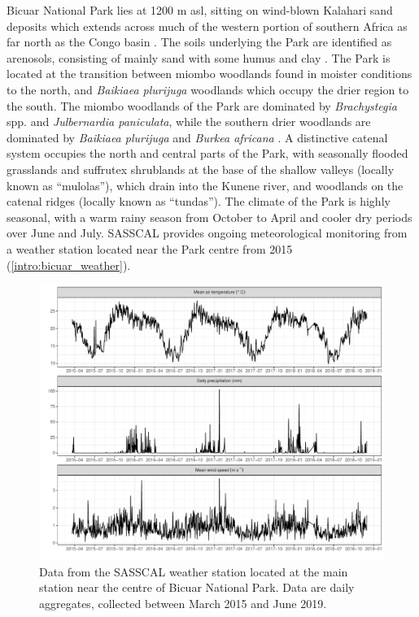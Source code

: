 \begin{refsection}
Bicuar National Park lies at \textapprox{}1200 m asl, sitting on wind-blown Kalahari sand deposits which extends across much of the western portion of southern Africa as far north as the Congo basin \citep{Shaw2002}. The soils underlying the Park are identified as arenosols, consisting of mainly sand with some humus and clay \citep{Jones2013, Hartemink2008}. The Park is located at the transition between miombo woodlands found in moister conditions to the north, and \textit{Baikiaea plurijuga} woodlands which occupy the drier region to the south. The miombo woodlands of the Park are dominated by \textit{Brachystegia} spp. and \textit{Julbernardia paniculata}, while the southern drier woodlands are dominated by \textit{Baikiaea plurijuga} and \textit{Burkea africana} \citep{Teixeira1968}. A distinctive catenal system occupies the north and central parts of the Park, with seasonally flooded grasslands and suffrutex shrublands at the base of the shallow valleys (locally known as ``mulolas''), which drain into the Kunene river, and woodlands on the catenal ridges (locally known as ``tundas''). The climate of the Park is highly seasonal, with a warm rainy season from October to April and cooler dry periods over June and July. SASSCAL provides ongoing meteorological monitoring from a weather station located near the Park centre from 2015 (\autoref{intro:bicuar_weather}).

\begin{figure}[tb]
	\includegraphics[width=\textwidth]{img/bicuar_weather}
	\caption[Bicuar National Park climate time series]{Data from the SASSCAL weather station located at the main station near the centre of Bicuar National Park. Data are daily aggregates, collected between March 2015 and June 2019.} 
	\label{intro:bicuar_weather}
\end{figure}


\end{refsection}
